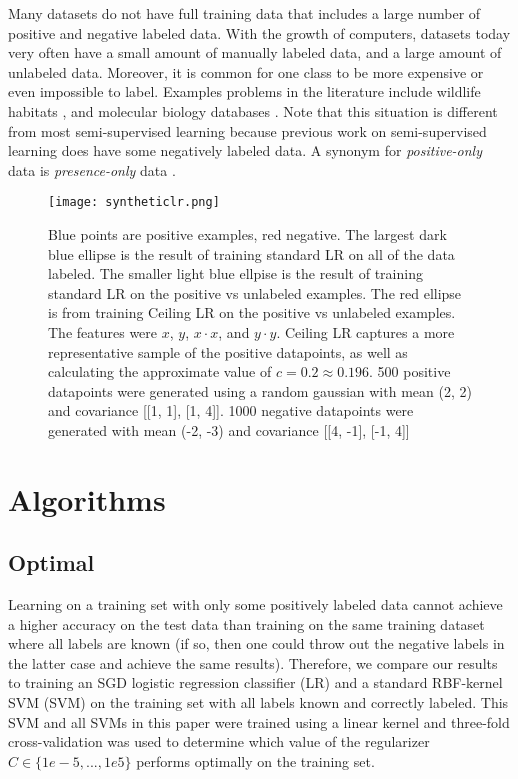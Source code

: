 \documentclass{article}
\begin{document}
Many datasets do not have full training data that includes a large number of positive and negative labeled data.  With the growth of computers, datasets today very often have a small amount of manually labeled data, and a large amount of unlabeled data. Moreover, it is common for one class to be more expensive or even impossible to label.  Examples problems in the literature include wildlife habitats \cite{ward08}, and molecular biology databases \cite{elkan08}.  Note that this situation is different from most semi-supervised learning because previous work on semi-supervised learning does have some negatively labeled data.  A synonym for \emph{positive-only} data is \emph{presence-only} data \cite{ward08}.

\begin{figure*}[ht!]
\vskip 0.2in
\begin{center}
\centerline{\texttt{[image: syntheticlr.png]}}
\caption{Blue points are positive examples, red negative. The largest dark blue ellipse is the result of training standard LR on all of the data labeled. The smaller light blue ellpise is the result of training standard LR on the positive vs unlabeled examples. The red ellipse is from training Ceiling LR on the positive vs unlabeled examples. The features were $x$, $y$, $x \cdot x$, and $y \cdot y$.  Ceiling LR captures a more representative sample of the positive datapoints, as well as calculating the approximate value of $c = 0.2 \approx 0.196$.   500 positive datapoints were generated using a random gaussian with mean (2, 2) and covariance [[1, 1], [1, 4]].  1000 negative datapoints were generated with mean (-2, -3) and covariance [[4, -1], [-1, 4]]}
\label{synthetic}
\end{center}
\vskip -0.2in
\end{figure*}

\section{Algorithms}

\subsection{Optimal}

Learning on a training set with only some positively labeled data cannot achieve a higher accuracy on the test data than training on the same training dataset where all labels are known (if so, then one could throw out the negative labels in the latter case and achieve the same results).  Therefore, we compare our results to training an SGD logistic regression classifier (LR) and a standard RBF-kernel SVM (SVM) on the training set with all labels known and correctly labeled.  This SVM and all SVMs in this paper were trained using a linear kernel and three-fold cross-validation was used to determine which value of the regularizer $C \in \{1e-5, ..., 1e5\}$ performs optimally on the training set.
\end{document}
